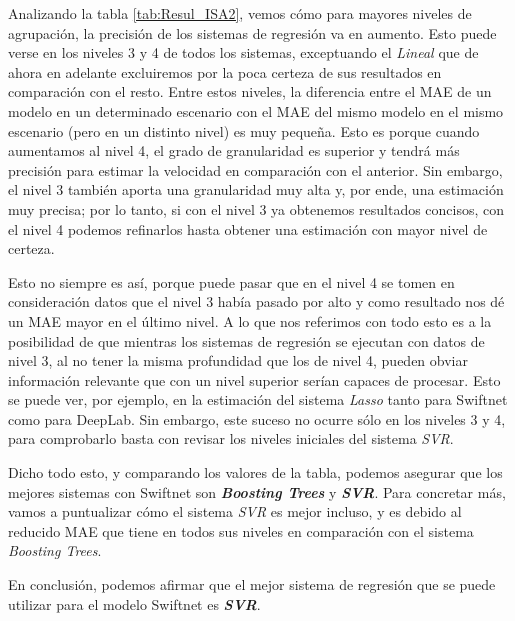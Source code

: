 Analizando la tabla \ref{tab:Resul_ISA2}, vemos cómo para mayores niveles de agrupación, la precisión de los sistemas de regresión va en aumento. Esto puede verse en los niveles 3 y 4 de todos los sistemas, exceptuando el \textit{Lineal} que de ahora en adelante excluiremos por la poca certeza de sus resultados en comparación con el resto. Entre estos niveles, la diferencia entre el \ac{MAE} de un modelo en un determinado escenario con el \ac{MAE} del mismo modelo en el mismo escenario (pero en un distinto nivel) es muy pequeña. Esto es porque cuando aumentamos al nivel 4, el grado de granularidad es superior y tendrá más precisión para estimar la velocidad en comparación con el anterior. Sin embargo, el nivel 3 también aporta una granularidad muy alta y, por ende, una estimación muy precisa; por lo tanto, si con el nivel 3 ya obtenemos resultados concisos, con el nivel 4 podemos refinarlos hasta obtener una estimación con mayor nivel de certeza.

Esto no siempre es así, porque puede pasar que en el nivel 4 se tomen en consideración datos que el nivel 3 había pasado por alto y como resultado nos dé un \ac{MAE} mayor en el último nivel. A lo que nos referimos con todo esto es a la posibilidad de que mientras los sistemas de regresión se ejecutan con datos de nivel 3, al no tener la misma profundidad que los de nivel 4, pueden obviar información relevante que con un nivel superior serían capaces de procesar. Esto se puede ver, por ejemplo, en la estimación del sistema \textit{Lasso} tanto para Swiftnet como para DeepLab. Sin embargo, este suceso no ocurre sólo en los niveles 3 y 4, para comprobarlo basta con revisar los niveles iniciales del sistema \textit{\ac{SVR}}.

Dicho todo esto, y comparando los valores de la tabla, podemos asegurar que los mejores sistemas con Swiftnet son \textbf{\textit{Boosting Trees}} y \textbf{\textit{\ac{SVR}}}. Para concretar más, vamos a puntualizar cómo el sistema \textit{\ac{SVR}} es mejor incluso, y es debido al reducido \ac{MAE} que tiene en todos sus niveles en comparación con el sistema \textit{Boosting Trees}.

En conclusión, podemos afirmar que el mejor sistema de regresión que se puede utilizar para el modelo Swiftnet es \textbf{\textit{\ac{SVR}}}.


